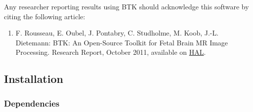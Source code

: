 \documentclass[a4paper,10pt]{article}
\begin{document}
  Any researcher reporting results using BTK should acknowledge this software by citing the following article:
  \begin{enumerate}
  \item F. Rousseau, E. Oubel, J. Pontabry, C. Studholme, M. Koob, J.-L. Dietemann: BTK: An Open-Source Toolkit for Fetal Brain MR Image Processing. Research Report, October 2011, available on \href{http://hal.archives-ouvertes.fr/index.php?halsid=d0mrvug09qhhou49vgaqc6ogd3&view_this_doc=hal-00671183&version=1}{HAL}.
  \end{enumerate}

  \subsection{Installation}

  \subsubsection{Dependencies}
\end{document}
